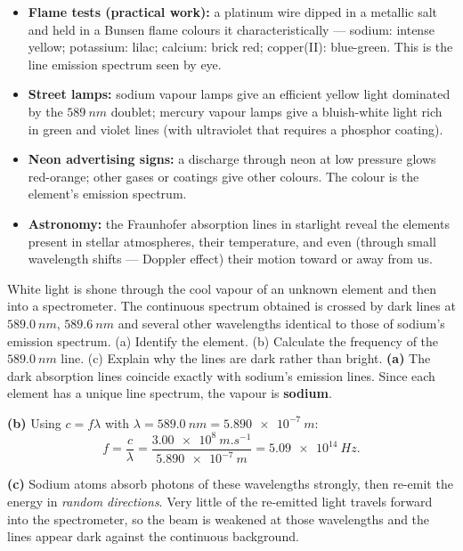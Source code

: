 \documentclass[11pt]{article}
\begin{document}
\begin{itemize}
\item \textbf{Flame tests (practical work):} a platinum wire dipped in a metallic salt and held in a Bunsen flame colours it characteristically — sodium: intense yellow; potassium: lilac; calcium: brick red; copper(II): blue-green. This is the line emission spectrum seen by eye.
\item \textbf{Street lamps:} sodium vapour lamps give an efficient yellow light dominated by the $\SI{589}{nm}$ doublet; mercury vapour lamps give a bluish-white light rich in green and violet lines (with ultraviolet that requires a phosphor coating).
\item \textbf{Neon advertising signs:} a discharge through neon at low pressure glows red-orange; other gases or coatings give other colours. The colour is the element's emission spectrum.
\item \textbf{Astronomy:} the Fraunhofer absorption lines in starlight reveal the elements present in stellar atmospheres, their temperature, and even (through small wavelength shifts — Doppler effect) their motion toward or away from us.
\end{itemize}

\begin{exoresolu}
White light is shone through the cool vapour of an unknown element and then into a spectrometer. The continuous spectrum obtained is crossed by dark lines at $\SI{589.0}{nm}$, $\SI{589.6}{nm}$ and several other wavelengths identical to those of sodium's emission spectrum. (a) Identify the element. (b) Calculate the frequency of the $\SI{589.0}{nm}$ line. (c) Explain why the lines are dark rather than bright.
\tcblower
\textbf{(a)} The dark absorption lines coincide exactly with sodium's emission lines. Since each element has a unique line spectrum, the vapour is \textbf{sodium}.

\textbf{(b)} Using $c = f\lambda$ with $\lambda = \SI{589.0}{nm} = \SI{5.890e-7}{m}$:
\[ f = \frac{c}{\lambda} = \frac{\SI{3.00e8}{m.s^{-1}}}{\SI{5.890e-7}{m}} = \SI{5.09e14}{Hz}. \]

\textbf{(c)} Sodium atoms absorb photons of these wavelengths strongly, then re-emit the energy in \emph{random directions}. Very little of the re-emitted light travels forward into the spectrometer, so the beam is weakened at those wavelengths and the lines appear dark against the continuous background.
\end{exoresolu}
\end{document}
